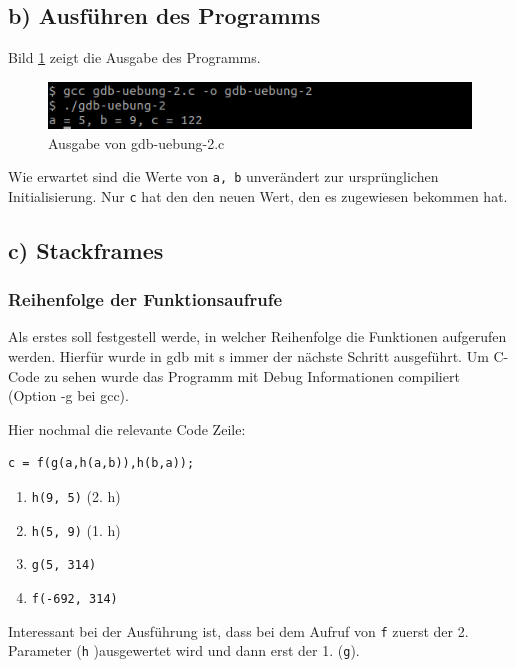 \documentclass[12pt]{article}
\begin{document}
\subsection{b) Ausführen des Programms}

Bild \ref{fig:aufgabe2b} zeigt die Ausgabe des Programms.
\begin{figure}[h!]
	\includegraphics[width=\textwidth]{Pictures/a2b.png}
	\caption{Ausgabe von gdb-uebung-2.c}
	\label{fig:aufgabe2b}
\end{figure}


Wie erwartet sind die Werte von \texttt{a, b} unverändert zur ursprünglichen Initialisierung. Nur \texttt{c} hat den den neuen Wert, den es zugewiesen bekommen hat.

\subsection{c) Stackframes}

\subsubsection{Reihenfolge der Funktionsaufrufe}

Als erstes soll festgestell werde, in welcher Reihenfolge die Funktionen aufgerufen werden. Hierfür wurde in gdb mit s immer der nächste Schritt ausgeführt. Um C-Code zu sehen wurde das Programm mit Debug Informationen compiliert (Option -g bei gcc).

Hier nochmal die relevante Code Zeile:
\begin{lstlisting}
c = f(g(a,h(a,b)),h(b,a));
\end{lstlisting}


\begin{enumerate}
\item \texttt{h(9, 5)} (2. h)
\item \texttt{h(5, 9)} (1. h)
\item \texttt{g(5, 314)}
\item \texttt{f(-692, 314)}
\end{enumerate}

Interessant bei der Ausführung ist, dass bei dem Aufruf von \texttt{f} zuerst der 2. Parameter (\texttt{h} )ausgewertet wird und dann erst der 1. (\texttt{g}).
\end{document}
